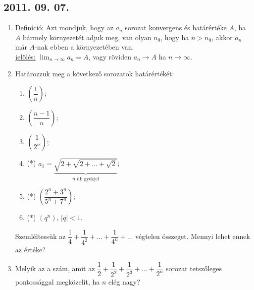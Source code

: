 \documentclass{article}
\newenvironment{abc}{\begin{enumerate}[label=\textit{\alph*})]}{\end{enumerate}}
\begin{document}
\subsection*{2011. 09. 07.}
\begin{enumerate}
\item \underline{Definíció:} Azt mondjuk, hogy az $a_n$ sorozat \underline{konvergens} és \underline{határértéke} $A$, ha $A$ bármely környezetét adjuk meg, van olyan $n_0$, hogy ha $n>n_0$, akkor $a_n$ már $A$-nak ebben a környezetében van.
\\
\underline{jelölés:} $\displaystyle\lim_{n \to \infty} a_n=A$, vagy röviden $a_n \to A$ ha $n \to \infty$.

\item Határozzuk meg a következő sorozatok határértékét:
	\begin{abc}
	\item $\left(\dfrac{1}{n}\right)$;
    \item $\left(\dfrac{n-1}{n}\right)$;
    \item $\left(\dfrac{1}{2^n}\right)$;
    \item (*) $a_1=\underbrace{\sqrt{2+\sqrt{2+\ldots+\sqrt{2}}}}_{\text{$n$ db gyökjel}}$;
    \item (*) $\left(\dfrac{2^n+3^n}{5^n+7^n}\right)$;
    \item (*) $(q^n)$, $|q|<1$.
	\end{abc}

Szemléltessük az
	$\dfrac{1}{4}+\dfrac{1}{4^2}+\ldots+\dfrac{1}{4^n}+\ldots$
	végtelen összeget. Mennyi lehet ennek az értéke?

\item Melyik az a szám, amit az
   $\dfrac{1}{2}+\dfrac{1}{2^2}+\dfrac{1}{2^3}+\ldots+\dfrac{1}{2^n}$
   sorozat tetszőleges pontossággal megközelít, ha $n$ elég nagy?

\end{enumerate}
\end{document}
